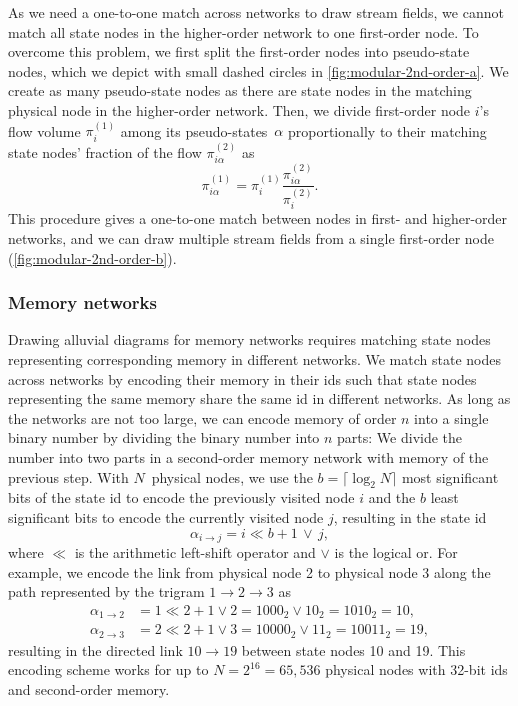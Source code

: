 \documentclass[aps,rmp,floats,floatfix,twocolumn,superscriptaddress,final]{revtex4-2}
\begin{document}
As we need a one-to-one match across networks to draw stream fields, we cannot match all state nodes in the higher-order network to one first-order node.
To overcome this problem, we first split the first-order nodes into pseudo-state nodes, which we depict with small dashed circles in \cref{fig:modular-2nd-order-a}.
We create as many pseudo-state nodes as there are state nodes in the matching physical node in the higher-order network.
Then, we divide first-order node $i$'s flow volume $\pi_i^{(1)}$ among its pseudo-states~$\alpha$ proportionally to their matching state nodes' fraction of the flow $\pi_{i\alpha}^{(2)}$ as
%
\begin{equation}
    \pi_{i\alpha}^{(1)} = \pi_i^{(1)} \frac{\pi_{i\alpha}^{(2)}}{\pi_i^{(2)}}.
\end{equation}
%
This procedure gives a one-to-one match between nodes in first- and higher-order networks, and we can draw multiple stream fields from a single first-order node (\cref{fig:modular-2nd-order-b}).

\subsubsection*{Memory networks}

Drawing alluvial diagrams for memory networks requires matching state nodes representing corresponding memory in different networks.
We match state nodes across networks by encoding their memory in their ids such that state nodes representing the same memory share the same id in different networks.
As long as the networks are not too large, we can encode memory of order $n$ into a single binary number by dividing the binary number into $n$ parts:
We divide the number into two parts in a second-order memory network with memory of the previous step.
With $N$~physical nodes, we use the $b = \lceil \log_2 N \rceil$ most significant bits of the state id to encode the previously visited node $i$ and the $b$ least significant bits to encode the currently visited node $j$, resulting in the state id
%
\begin{equation}
    \alpha_{i \to j} = i \ll b + 1 \, \lor \, j,
\end{equation}
%
where $\ll$ is the arithmetic left-shift operator and $\lor$ is the logical or.
For example, we encode the link from physical node 2 to physical node 3 along the path represented by the trigram $1\to 2\to 3$ as
%
\begin{align}
    \alpha_{1 \to 2} &= 1 \ll 2 + 1 \lor 2 = 1000_2 \lor 10_2 = 1010_2 = 10, \nonumber \\
    \alpha_{2 \to 3} &= 2 \ll 2 + 1 \lor 3 = 10000_2 \lor 11_2 = 10011_2 = 19, \nonumber
\end{align}
%
resulting in the directed link $10 \to 19$ between state nodes 10 and 19.
This encoding scheme works for up to $N = 2^{16} = 65,536$ physical nodes with 32-bit ids and second-order memory.
\end{document}
